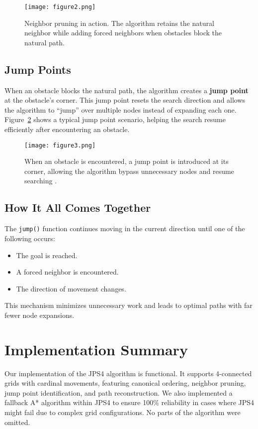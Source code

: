 \documentclass[11pt]{article}
\begin{document}
\begin{figure}
    \centering
    \texttt{[image: figure2.png]}
    \caption{Neighbor pruning in action. The algorithm retains the natural neighbor while adding forced neighbors when obstacles block the natural path.}
    \label{fig:pruning}
\end{figure}



\subsection*{Jump Points}
When an obstacle blocks the natural path, the algorithm creates a \textbf{jump point} at the obstacle's corner. This jump point resets the search direction and allows the algorithm to “jump” over multiple nodes instead of expanding each one. Figure~\ref{fig:jump} shows a typical jump point scenario, helping the search resume efficiently after encountering an obstacle.


\begin{figure}
    \centering
    \texttt{[image: figure3.png]}
    \caption{When an obstacle is encountered, a jump point is introduced at its corner, allowing the algorithm bypass unnecessary nodes and resume searching .}
    \label{fig:jump}
\end{figure}

\subsection*{How It All Comes Together}
The \texttt{jump()} function continues moving in the current direction until one of the following occurs:
\begin{itemize}
    \item The goal is reached.
    \item A forced neighbor is encountered.
    \item The direction of movement changes.
\end{itemize}
This mechanism minimizes unnecessary work and leads to optimal paths with far fewer node expansions.

\section{Implementation Summary}

Our implementation of the JPS4 algorithm is functional. It supports 4-connected grids with cardinal movements, featuring canonical ordering, neighbor pruning, jump point identification, and path reconstruction. We also implemented a fallback A* algorithm within JPS4 to ensure 100\% reliability in cases where JPS4 might fail due to complex grid configurations. No parts of the algorithm were omitted. 
\end{document}
